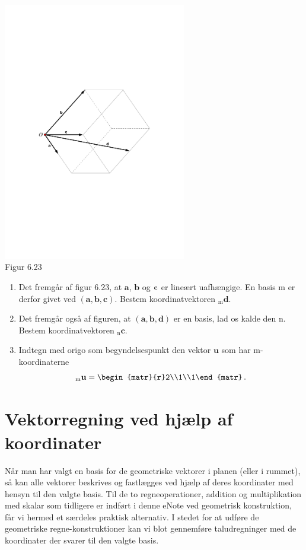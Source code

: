 \begin{exercise}

\begin{center}
		\includegraphics[trim=3cm 9.9cm 3cm 9.9cm,width=0.60\textwidth,clip]{geometer/abasis02.pdf}				
		\\Figur 6.23
\end{center}
\begin{enumerate}
\item
Det fremgår af figur 6.23, at $\mathbf a$, $\mathbf b$ og $\mathbf{c}$ er lineært uafhængige. En basis m er derfor givet ved $(\mathbf a, \mathbf b,\mathbf c)$. Bestem koordinatvektoren $_\mathrm m\mathbf d$. 
\item 
Det fremgår også af figuren, at $(\mathbf a, \mathbf b,\mathbf d)$ er en basis, lad os kalde den n. Bestem koordinatvektoren $_\mathrm n\mathbf c$.
\item
Indtegn med origo som begyndelsespunkt den vektor $\mathbf u$ som har m-koordinaterne
$$
 _\mathrm m\mathbf u=
\begin{matr}{r}2\\1\\1\end{matr}\,.
$$
\end{enumerate}

\end{exercise}  

\section{Vektorregning ved hjælp af koordinater}
Når man har valgt en basis for de geometriske vektorer i planen (eller i rummet), så kan alle vektorer beskrives og fastlægges ved hjælp af deres koordinater med hensyn til den valgte basis. Til de to regneoperationer,  addition og multiplikation med skalar som tidligere er indført i denne eNote ved geometrisk konstruktion, får vi hermed et særdeles praktisk alternativ. I stedet for at udføre de geometriske regne-konstruktioner kan vi blot gennemføre taludregninger med de koordinater der svarer til den valgte basis.\\

